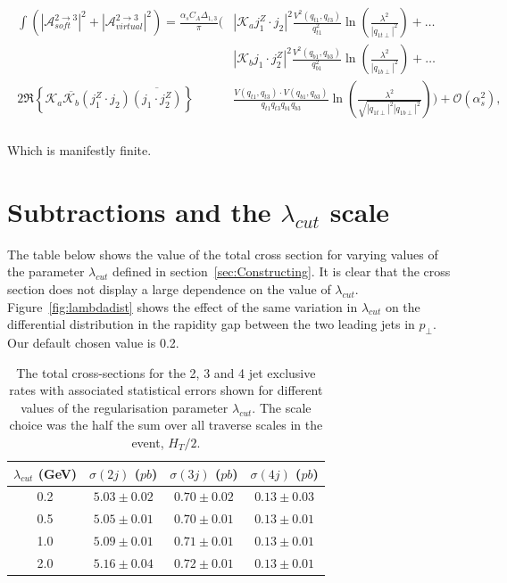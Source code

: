 		\begin{align}
		\begin{split}
			\int\left(|\mathcal{A}^{2\rightarrow3}_{soft}|^2 + |\mathcal{A}^{2\rightarrow3}_{virtual}|^2\right) =
			\frac{\alpha_sC_A\Delta_{1,3}}{\pi}\Bigg(&|\mathcal{K}_aj_1^Z\cdot j_2|^2 \frac{V^2(q_{t1},
			q_{t3})}{q_{t1}^2}\ln\left(\frac{\lambda^2}{|q_{1t\perp}|^2}\right)+\ldots \\
			& |\mathcal{K}_bj_1\cdot j_2^Z|^2 \frac{V^2(q_{b1}, q_{b3})}{q_{b1}^2}\ln
			\left(\frac{\lambda^2}{|q_{1b\perp}|^2}\right)+\ldots \\
			2\Re\left\{\mathcal{K}_a\overline{\mathcal{K}_b}  (j_1^Z\cdot j_2)\overline{(j_1\cdot j_2^Z)}\right\}
			&\frac{V(q_{t1}, q_{t3})\cdot V(q_{b1}, q_{b3})}{q_{t1}q_{t3}q_{b1}q_{b3}}\ln
			\left(\frac{\lambda^2}{\sqrt{|q_{1t\perp}|^2|q_{1b\perp}|^2}}\right)\Bigg) + \mathcal{O}(\alpha_s^2),\\
		\end{split}
		\end{align}

		Which is manifestly finite.

	\section{Subtractions and the $\lambda_{cut}$ scale}
		\label{sec:indep-lambd}

		The table below shows the value of the total cross section for varying values of
		the parameter $\lambda_{cut}$ defined in section~\eqref{sec:Constructing}.  It is
		clear that the cross section does not display a large dependence on the value of $\lambda_{cut}$.
		Figure~\eqref{fig:lambdadist} shows the effect of the same variation in $\lambda_{cut}$ on the
		differential distribution in the rapidity gap between the two leading jets in $p_\perp$.
		Our default chosen value is 0.2.

		\begin{table}[htp!]
		\begin{center}
			\begin{tabular}{| c | c | c | c |}
			\hline
			$\lambda_{cut}$ (GeV) & $\sigma(2j)$ ($pb$) & $\sigma(3j)$ ($pb$) & $\sigma(4j)$ ($pb$) \\ \hline
			0.2 & $5.03 \pm 0.02$ & $0.70 \pm 0.02$ & $0.13 \pm 0.03$ \\
			0.5 & $5.05 \pm 0.01$ & $0.70 \pm 0.01$ & $0.13 \pm 0.01$ \\
			1.0 & $5.09 \pm 0.01$ & $0.71 \pm 0.01$ & $0.13 \pm 0.01$ \\
			2.0 & $5.16 \pm 0.04$ & $0.72 \pm 0.01$ & $0.13 \pm 0.01$ \\ \hline
			\end{tabular}
			\caption{The total cross-sections for the 2, 3 and 4 jet exclusive rates with associated
			         statistical errors shown for different values of the regularisation parameter $\lambda_{cut}$.
			         The scale choice was the half the sum over all traverse scales in the event, $H_T/2$.}
		\end{center}
		\end{table}

